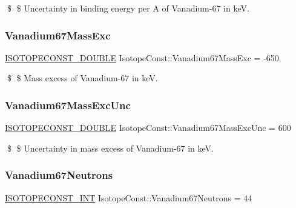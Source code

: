 \$ \$ Uncertainty in binding energy per A of Vanadium-\/67 in keV. \mbox{\label{group___isotope_const-_vanadium-_v67_gafdb263d8a8198e5dd6111aae330b726a}} 
\subsubsection{\texorpdfstring{Vanadium67\+Mass\+Exc}{Vanadium67MassExc}}
{\footnotesize\ttfamily \mbox{\hyperlink{group___isotope_const-_macros_ga8f45a7272ce02c0b4c65c44636ed719a}{I\+S\+O\+T\+O\+P\+E\+C\+O\+N\+S\+T\+\_\+\+D\+O\+U\+B\+LE}} Isotope\+Const\+::\+Vanadium67\+Mass\+Exc = -\/650}

\$ \$ Mass excess of Vanadium-\/67 in keV. \mbox{\label{group___isotope_const-_vanadium-_v67_gac7bc5bf6b1691a3d80ffe174bff8d5d6}} 
\subsubsection{\texorpdfstring{Vanadium67\+Mass\+Exc\+Unc}{Vanadium67MassExcUnc}}
{\footnotesize\ttfamily \mbox{\hyperlink{group___isotope_const-_macros_ga8f45a7272ce02c0b4c65c44636ed719a}{I\+S\+O\+T\+O\+P\+E\+C\+O\+N\+S\+T\+\_\+\+D\+O\+U\+B\+LE}} Isotope\+Const\+::\+Vanadium67\+Mass\+Exc\+Unc = 600}

\$ \$ Uncertainty in mass excess of Vanadium-\/67 in keV. \mbox{\label{group___isotope_const-_vanadium-_v67_ga06c6de09e9829181710809832b25082e}} 
\subsubsection{\texorpdfstring{Vanadium67\+Neutrons}{Vanadium67Neutrons}}
{\footnotesize\ttfamily \mbox{\hyperlink{group___isotope_const-_macros_ga5f18360b3e99483a35c32d789e62621c}{I\+S\+O\+T\+O\+P\+E\+C\+O\+N\+S\+T\+\_\+\+I\+NT}} Isotope\+Const\+::\+Vanadium67\+Neutrons = 44}

